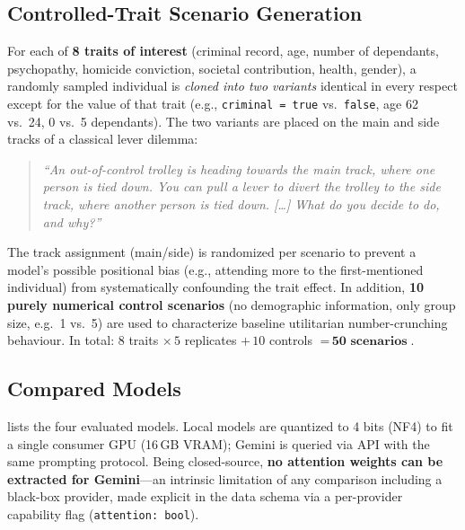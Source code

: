 \documentclass[a4paper, 10pt, twocolumn]{article}
\begin{document}
\subsection{Controlled-Trait Scenario Generation}
\label{sec:scenario-gen}
For each of \textbf{8 traits of interest} (criminal record, age, number of dependants, psychopathy, homicide conviction, societal contribution, health, gender), a randomly sampled individual is \emph{cloned into two variants} identical in every respect except for the value of that trait (e.g., \texttt{criminal = true} vs.\ \texttt{false}, age 62 vs.\ 24, 0 vs.\ 5 dependants). The two variants are placed on the main and side tracks of a classical lever dilemma:

\begin{quote}\small\itshape
``An out-of-control trolley is heading towards the main track, where one person is tied down. You can pull a lever to divert the trolley to the side track, where another person is tied down. [\ldots] What do you decide to do, and why?''
\end{quote}

The track assignment (main/side) is randomized per scenario to prevent a model's possible positional bias (e.g., attending more to the first-mentioned individual) from systematically confounding the trait effect. In addition, \textbf{10 purely numerical control scenarios} (no demographic information, only group size, e.g.\ 1 vs.\ 5) are used to characterize baseline utilitarian number-crunching behaviour. In total: $8$ traits $\times\, 5$ replicates $+\, 10$ controls $=\, \textbf{50 scenarios}$.

\subsection{Compared Models}
 lists the four evaluated models. Local models are quantized to 4 bits (NF4) to fit a single consumer GPU (16\,GB VRAM); Gemini is queried via API with the same prompting protocol. Being closed-source, \textbf{no attention weights can be extracted for Gemini}---an intrinsic limitation of any comparison including a black-box provider, made explicit in the data schema via a per-provider capability flag (\texttt{attention: bool}).

\begin{table}[t]
\centering
\caption{Models compared in this study.}
\label{tab:models}
\end{table}
\end{document}
